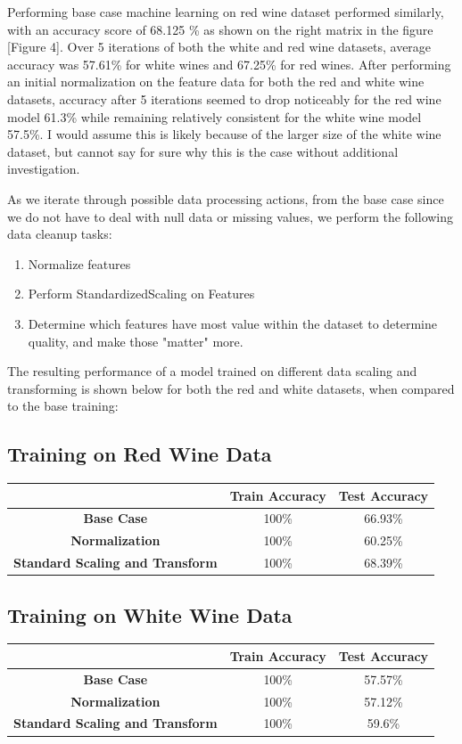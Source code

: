 \documentclass[titlepage]{article}
\begin{document}
\noindent Performing base case machine learning on red wine dataset performed similarly, with an accuracy score of 68.125 \% as shown on the right matrix in the figure [Figure 4].  Over 5 iterations of both the white and red wine datasets, average accuracy was 57.61\% for white wines and  67.25\% for red wines.  After performing an initial normalization on the feature data for both the red and white wine datasets, accuracy after 5 iterations seemed to drop noticeably for the red wine model 61.3\% while remaining relatively consistent for the white wine model 57.5\%.  I would assume this is likely because of the larger size of the white wine dataset, but cannot say for sure why this is the case without additional investigation.

\noindent As we iterate through possible data processing actions, from the base case since we do not have to deal with null data or missing values, we perform the following  data cleanup tasks:
\begin{enumerate}
	\item Normalize features
	\item Perform StandardizedScaling on Features
	\item Determine which features have most value within the dataset to determine quality, and make those "matter" more.
\end{enumerate}

\noindent The resulting performance of a model trained on different data scaling and transforming is shown below for both the red and white datasets, when compared to the base training:  
\subsection*{Training on Red Wine Data}
\begin{center}
	\begin{tabular}{ | c | c | c | }
		\hline
		& \textbf{Train Accuracy} & \textbf{Test Accuracy} \\ 
		\hline
		\textbf{Base Case } & 100\% & 66.93\% \\
		\textbf{Normalization} & 100\% & 60.25\% \\
		\textbf{Standard Scaling and Transform} & 100\% & 68.39\%  \\
		\hline
	\end{tabular}
\end{center}

\subsection*{Training on White Wine Data}
\begin{center}
	\begin{tabular}{ | c | c | c | }
		\hline
		& \textbf{Train Accuracy} & \textbf{Test Accuracy} \\ 
		\hline
		\textbf{Base Case} & 100\% & 57.57\% \\
		\textbf{Normalization} & 100\% & 57.12\% \\
		\textbf{Standard Scaling and Transform} & 100\% & 59.6\%  \\
		\hline
	\end{tabular}
\end{center}
\end{document}
